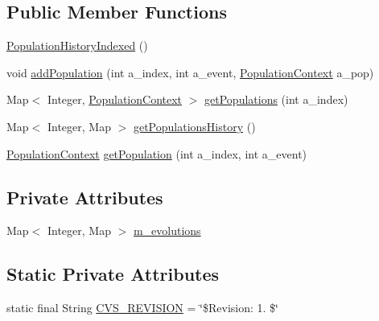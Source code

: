 \subsection*{Public Member Functions}
\begin{DoxyCompactItemize}
\item 
\hyperlink{classorg_1_1jgap_1_1eval_1_1_population_history_indexed_acefd3ed830265082a12e5e60a216be76}{Population\-History\-Indexed} ()
\item 
void \hyperlink{classorg_1_1jgap_1_1eval_1_1_population_history_indexed_a6e42cc89a53de72c47d441050b452dbf}{add\-Population} (int a\-\_\-index, int a\-\_\-event, \hyperlink{classorg_1_1jgap_1_1eval_1_1_population_context}{Population\-Context} a\-\_\-pop)
\item 
Map$<$ Integer, \hyperlink{classorg_1_1jgap_1_1eval_1_1_population_context}{Population\-Context} $>$ \hyperlink{classorg_1_1jgap_1_1eval_1_1_population_history_indexed_a2d39553452f83c6599183bd6c835dd7e}{get\-Populations} (int a\-\_\-index)
\item 
Map$<$ Integer, Map $>$ \hyperlink{classorg_1_1jgap_1_1eval_1_1_population_history_indexed_aabebc22c471936bd3ee44ba97985bf0e}{get\-Populations\-History} ()
\item 
\hyperlink{classorg_1_1jgap_1_1eval_1_1_population_context}{Population\-Context} \hyperlink{classorg_1_1jgap_1_1eval_1_1_population_history_indexed_aaa16c78bff06c890e6ee974e13fbbf9a}{get\-Population} (int a\-\_\-index, int a\-\_\-event)
\end{DoxyCompactItemize}
\subsection*{Private Attributes}
\begin{DoxyCompactItemize}
\item 
Map$<$ Integer, Map $>$ \hyperlink{classorg_1_1jgap_1_1eval_1_1_population_history_indexed_a4cedcd019d4c8c769a1bbc64ef08581a}{m\-\_\-evolutions}
\end{DoxyCompactItemize}
\subsection*{Static Private Attributes}
\begin{DoxyCompactItemize}
\item 
static final String \hyperlink{classorg_1_1jgap_1_1eval_1_1_population_history_indexed_a3ca784f28583ecb7458f541813a1a257}{C\-V\-S\-\_\-\-R\-E\-V\-I\-S\-I\-O\-N} = \char`\"{}\$Revision\-: 1. \$\char`\"{}
\end{DoxyCompactItemize}


